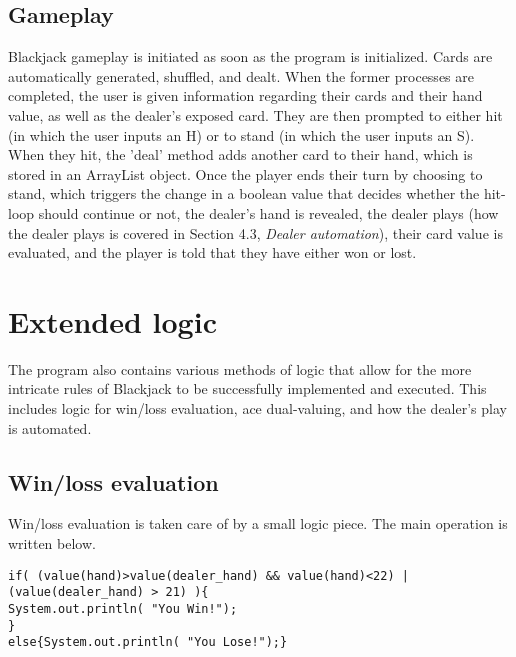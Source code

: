 \documentclass[english]{article}
\begin{document}
\subsection{Gameplay}
Blackjack gameplay is initiated as soon as the program is initialized. Cards are automatically generated, shuffled, and dealt. When the former processes are completed, the user is given information regarding their cards and their hand value, as well as the dealer's exposed card. They are then prompted to either hit (in which the user inputs an H) or to stand (in which the user inputs an S). When they hit, the 'deal' method adds another card to their hand, which is stored in an ArrayList object. Once the player ends their turn by choosing to stand, which triggers the change in a boolean value that decides whether the hit-loop should continue or not, the dealer's hand is revealed, the dealer plays (how the dealer plays is covered in Section 4.3, \textit{Dealer automation}), their card value is evaluated, and the player is told that they have either won or lost.

\section{Extended logic}

The program also contains various methods of logic that allow for the more intricate rules of Blackjack to be successfully implemented and executed. This includes logic for win/loss evaluation, ace dual-valuing, and how the dealer's play is automated.

\subsection{Win/loss evaluation}

Win/loss evaluation is taken care of by a small logic piece. The main operation is written below. \\
\begin{verbatim}
if( (value(hand)>value(dealer_hand) && value(hand)<22) | (value(dealer_hand) > 21) ){
System.out.println( "You Win!");
}
else{System.out.println( "You Lose!");}
\end{verbatim}
\end{document}
